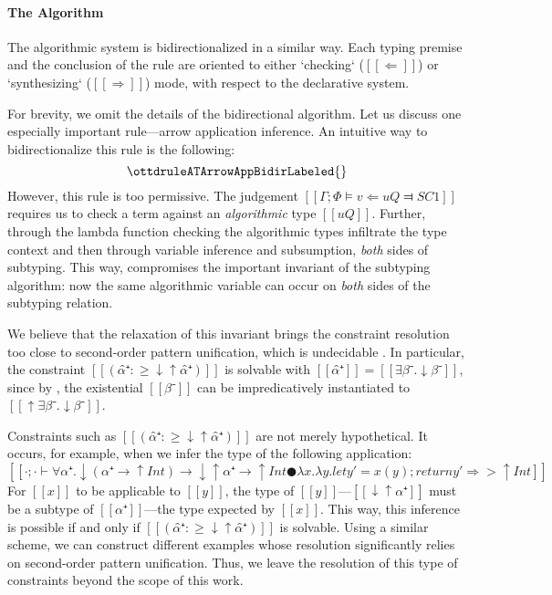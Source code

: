 \vspace{\baselineskip}
\paragraph*{The Algorithm}
    The algorithmic system is bidirectionalized in a similar way. 
    Each typing premise and the conclusion of the rule are oriented
    to either `checking` ($[[⇐]]$) or `synthesizing` ($[[⇒]]$) mode,
    with respect to the declarative system. 
 
    For brevity, we omit the details of the bidirectional algorithm.
    Let us discuss one especially important rule---arrow application inference. 
    An intuitive way to bidirectionalize this rule is the following:
    $$ \ottdruleATArrowAppBidirLabeled{} $$
    However, this rule is too permissive. 
    The judgement $[[Γ ; Φ ⊨ v ⇐ uQ ⫤ SC1]]$
    requires us to check a term against an \emph{algorithmic} 
    type $[[uQ]]$. Further, through the
    lambda function checking 
    the algorithmic types infiltrate the type context
    and then through variable inference and subsumption, 
    \emph{both} sides of subtyping. 
    This way, 
    compromises the important invariant
    of the subtyping algorithm: 
    now the same algorithmic variable can occur on \emph{both}
     sides of the subtyping relation.

    We believe that the relaxation of this invariant brings the 
    constraint resolution too close to second-order pattern 
    unification, which is undecidable \cite{goldfarb81:undecidability}.
    In particular, the constraint $[[(α̂⁺ :≥ ↓↑α̂⁺)]]$ is solvable with 
    $[[α̂⁺]] = [[∃β⁻.↓β⁻]]$, 
    since by , 
    the existential $[[β⁻]]$ can be impredicatively instantiated to $[[↑∃β⁻.↓β⁻]]$. 

    Constraints such as $[[(α̂⁺ :≥ ↓↑α̂⁺)]]$ are not merely hypothetical. 
    It occurs, for example, when we infer the type of the following application:
    $$[[· ; · ⊢ ∀α⁺ . ↓(α⁺ → ↑Int) → ↓↑α⁺ → ↑Int ● {λx.λy.let y' = x(y); return y'} ⇒> ↑Int]]$$
    For $[[x]]$ to be applicable to $[[y]]$,
    the type of $[[y]]$---$[[↓↑α⁺]]$ must be a subtype of
    $[[α⁺]]$---the type expected by $[[x]]$. This way, 
    this inference is possible if and only if
    $[[(α̂⁺ :≥ ↓↑α̂⁺)]]$ is solvable.
    Using a similar scheme, we can construct different examples
    whose resolution significantly relies on second-order pattern unification.
    Thus, we leave the resolution of this type of constraints beyond the scope of this work.


